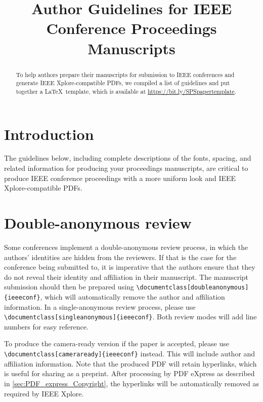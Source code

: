 \documentclass[9pt]{ieeeconf}
\title{Author Guidelines for IEEE Conference Proceedings Manuscripts}
\begin{document}
\maketitle

\begin{abstract}
To help authors prepare their manuscripts for submission to IEEE conferences and
generate IEEE Xplore-compatible PDFs, we compiled a list of guidelines and put
together a \LaTeX\ template, which is available at
\url{https://bit.ly/SPSpapertemplate}.
\end{abstract}


\section{Introduction}
\label{sec:intro}

The guidelines below, including complete descriptions of the fonts, spacing, and
related information for producing your proceedings manuscripts, are critical to
produce IEEE conference proceedings with a more uniform look and IEEE
Xplore-compatible PDFs.


\section{Double-anonymous review}
\label{sec:double_anonymous}

Some conferences implement a double-anonymous review process, in which the
authors' identities are hidden from the reviewers. If that is the case for the
conference being submitted to, it is imperative that the authors ensure that
they do not reveal their identity and affiliation in their manuscript. The
manuscript submission should then be prepared using
\texttt{\textbackslash{}documentclass[doubleanonymous]\{ieeeconf\}}, which will
automatically remove the author and affiliation information. In a
single-anonymous review process, please use
\texttt{\textbackslash{}documentclass[singleanonymous]\{ieeeconf\}}. Both review
modes will add line numbers for easy reference.

To produce the camera-ready version if the paper is accepted, please use
\texttt{\textbackslash{}documentclass[cameraready]\{ieeeconf\}} instead. This
will include author and affiliation information. Note that the produced PDF will
retain hyperlinks, which is useful for sharing as a preprint. After processing
by PDF eXpress as described in \cref{sec:PDF_express_Copyright}, the hyperlinks
will be automatically removed as required by IEEE Xplore.
\end{document}
